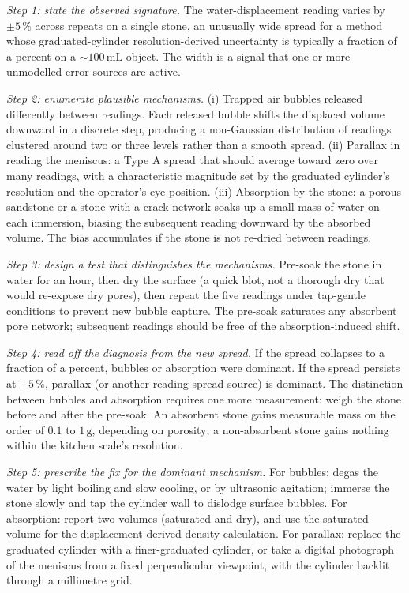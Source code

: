 \emph{Step 1: state the observed signature.}
The water-displacement reading varies by $\pm 5\,\%$ across
repeats on a single stone, an unusually wide spread for a method
whose graduated-cylinder resolution-derived uncertainty is
typically a fraction of a percent on a $\sim 100 \,\si{\milli
\liter}$ object. The width is a signal that one or more
unmodelled error sources are active.

\emph{Step 2: enumerate plausible mechanisms.}
(i) Trapped air bubbles released differently between readings.
Each released bubble shifts the displaced volume downward in a
discrete step, producing a non-Gaussian distribution of readings
clustered around two or three levels rather than a smooth spread.
(ii) Parallax in reading the meniscus: a Type A spread that should
average toward zero over many readings, with a characteristic
magnitude set by the graduated cylinder's resolution and the
operator's eye position.
(iii) Absorption by the stone: a porous sandstone or a stone with a
crack network soaks up a small mass of water on each immersion,
biasing the subsequent reading downward by the absorbed volume.
The bias accumulates if the stone is not re-dried between
readings.

\emph{Step 3: design a test that distinguishes the mechanisms.}
Pre-soak the stone in water for an hour, then dry the surface (a
quick blot, not a thorough dry that would re-expose dry pores),
then repeat the five readings under tap-gentle conditions to
prevent new bubble capture. The pre-soak saturates any absorbent
pore network; subsequent readings should be free of the
absorption-induced shift.

\emph{Step 4: read off the diagnosis from the new spread.}
If the spread collapses to a fraction of a percent, bubbles or
absorption were dominant. If the spread persists at $\pm 5\,\%$,
parallax (or another reading-spread source) is dominant. The
distinction between bubbles and absorption requires one more
measurement: weigh the stone before and after the pre-soak. An
absorbent stone gains measurable mass on the order of $0.1$ to
$1 \,\si{\gram}$, depending on porosity; a non-absorbent stone
gains nothing within the kitchen scale's resolution.

\emph{Step 5: prescribe the fix for the dominant mechanism.}
For bubbles: degas the water by light boiling and slow cooling,
or by ultrasonic agitation; immerse the stone slowly and tap the
cylinder wall to dislodge surface bubbles. For absorption: report
two volumes (saturated and dry), and use the saturated volume for
the displacement-derived density calculation. For parallax: replace
the graduated cylinder with a finer-graduated cylinder, or take a
digital photograph of the meniscus from a fixed perpendicular
viewpoint, with the cylinder backlit through a millimetre grid.

